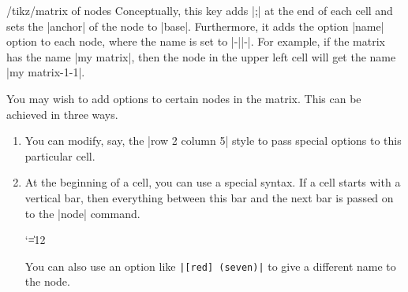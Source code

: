 \begin{key}{/tikz/matrix of nodes}
  Conceptually, this key adds |;| at
  the end of each cell and sets the |anchor| of the node to
  |base|. Furthermore, it adds  the option |name| option to each node,
  where the name is set to  |-||-|. For  example, if the matrix has
  the name |my matrix|, then the node in  the upper left cell will get
  the name |my matrix-1-1|. 
\begin{codeexample}[]
\end{codeexample}

  You may wish to add options to certain nodes in the matrix. This can
  be achieved in three ways.
  \begin{enumerate}
  \item You can modify, say, the
    |row 2 column 5| style to pass special options to this particular
    cell.

\begin{codeexample}[]
\end{codeexample}
    
  \item At the beginning of a cell, you can use a special syntax. If a
    cell starts with a vertical bar, then everything between this bar
    and the next bar is passed on to the |node| command.
{\catcode`\|=12
\begin{codeexample}[]
\end{codeexample}
}
  You can also use an option like \verb!|[red] (seven)|! to give a
  different name to the node.


\end{enumerate}
\end{key}
